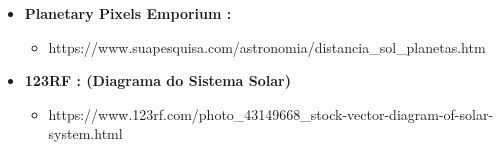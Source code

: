 \documentclass[a4paper]{article}
\begin{document}
\begin{itemize}

  \item \textbf{Planetary Pixels Emporium :}
  \begin{itemize}
    \item https://www.suapesquisa.com/astronomia/distancia\_sol\_planetas.htm
  \end{itemize}
  \item \textbf{123RF : (Diagrama do Sistema Solar)}
  \begin{itemize}
    \item https://www.123rf.com/photo\_43149668\_stock-vector-diagram-of-solar-system.html
  \end{itemize}


\end{itemize}
\end{document}
